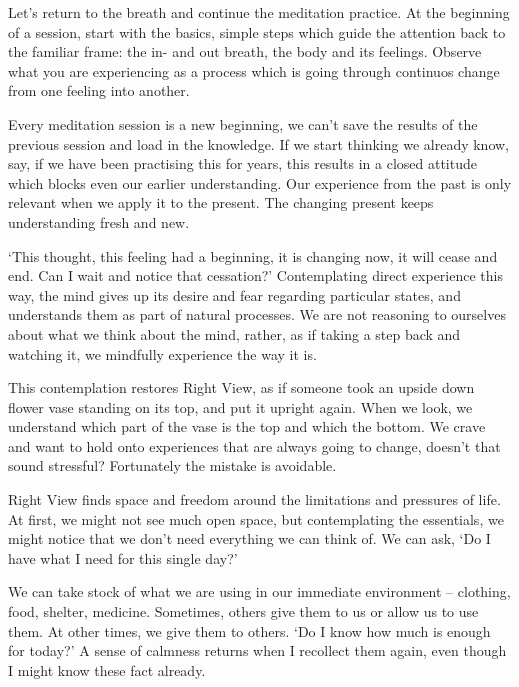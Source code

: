 
\noindent Let's return to the breath and continue the meditation
practice. At the beginning of a session, start with the basics, simple
steps which guide the attention back to the familiar frame: the in- and
out breath, the body and its feelings. Observe what you are experiencing
as a process which is going through continuos change from one feeling
into another.

Every meditation session is a new beginning, we can't save the results
of the previous session and load in the knowledge. If we start thinking
we already know, say, if we have been practising this for years, this
results in a closed attitude which blocks even our earlier
understanding. Our experience from the past is only relevant when we
apply it to the present. The changing present keeps understanding fresh
and new.

`This thought, this feeling had a beginning, it is changing now, it will
cease and end. Can I wait and notice that cessation?' Contemplating
direct experience this way, the mind gives up its desire and fear
regarding particular states, and understands them as part of natural
processes. We are not reasoning to ourselves about what we think about
the mind, rather, as if taking a step back and watching it, we mindfully
experience the way it is.

\enlargethispage*{2\baselineskip}

This contemplation restores Right View, as if someone took an upside
down flower vase standing on its top, and put it upright again. When we
look, we understand which part of the vase is the top and which the
bottom. We crave and want to hold onto experiences that are always going
to change, doesn't that sound stressful? Fortunately the mistake is
avoidable.

\clearpage


Right View finds space and freedom around the limitations and pressures
of life. At first, we might not see much open space, but contemplating
the essentials, we might notice that we don't need everything we can
think of. We can ask, `Do I have what I need for this single day?'

We can take stock of what we are using in our immediate environment --
clothing, food, shelter, medicine. Sometimes, others give them to us or
allow us to use them. At other times, we give them to others. `Do I know
how much is enough for today?' A sense of calmness returns when I
recollect them again, even though I might know these fact already.


